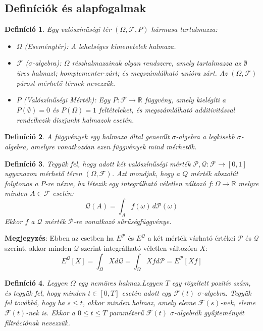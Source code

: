 \documentclass[12pt, a4paper]{article}
\newtheorem{definition}{Definíció}[subsection]
\begin{document}
\subsection{Definíciók és alapfogalmak}

\begin{definition}\label{def_elso}
Egy valószínűségi tér $(\Omega, \mathcal{F}, P)$ hármasa tartalmazza:
\begin{itemize}
    \item $\Omega$ (Eseménytér): A lehetséges kimenetelek halmaza.
    \item $\mathcal{F}$ ($\sigma$-algebra): $\Omega$ részhalmazainak olyan rendszere, amely tartalmazza az $\emptyset$ üres halmazt; komplementer-zárt; és megszámlálható unióra zárt. Az $(\Omega, \mathcal{F})$ párost mérhető térnek nevezzük.
    \item $P$ (Valószínűségi Mérték): Egy $P: \mathcal{F} \to \mathbb{R}$ függvény, amely kielégíti a $P(\emptyset)=0$ és $P(\Omega)=1$ feltételeket, és megszámlálható additivitással rendelkezik diszjunkt halmazok esetén.
\end{itemize}
\end{definition}

\begin{definition}\label{def_masodik}
A függvények egy halmaza által generált $\sigma$-algebra a legkisebb $\sigma$-algebra, amelyre vonatkozóan ezen függvények mind mérhetők.
\end{definition}

\begin{definition}\label{def_harmadik}
Tegyük fel, hogy adott két valószínűségi mérték $\mathcal{P},\mathcal{Q}: \mathcal{F} \to [0,1]$ ugyanazon mérhető téren $(\Omega, \mathcal{F})$. Azt mondjuk, hogy a $Q$ mérték abszolút folytonos a $P$-re nézve, ha létezik egy integrálható véletlen változó $f: \Omega \to \mathbb{R}$ melyre minden $A \in \mathcal{F}$ esetén:
\[
\mathcal{Q}(A) = \int_A f (\omega) \, d\mathcal{P}(\omega)
\]
Ekkor $f$ a $\mathcal{Q}$ mérték $\mathcal{P}$-re vonatkozó sűrűségfüggvénye.
\end{definition}

\noindent \textbf{Megjegyzés}: Ebben az esetben ha $E^{\mathcal{P}}$ és $E^{\mathcal{Q}}$ a két mérték várható értékei $\mathcal{P}$ és $\mathcal{Q}$ szerint, akkor minden $\mathcal{Q}$-szerint integrálható véletlen változóra $X$:
\[
E^{\mathcal{Q}}[X] = \int_{\Omega} X d\mathcal{Q} = \int_{\Omega} X f d\mathcal{P} = E^{\mathcal{P}}[X f]
\]

\begin{definition}\label{def_negyedik}
\cite{shreve2004} Legyen $\Omega$ egy nemüres halmaz.Legyen $T$ egy rögzített pozitív szám, és tegyük fel, hogy minden $t \in [0,T]$ esetén adott egy $\mathcal{F}(t)$ $\sigma$-algebra. Tegyük fel továbbá, hogy ha $s \le t$, akkor minden halmaz, amely eleme $\mathcal{F}(s)$-nek, eleme $\mathcal{F}(t)$-nek is. Ekkor a $0 \le t \le T$ paraméterű $\mathcal{F}(t)$ $\sigma$-algebrák gyűjteményét filtrációnak nevezzük.
\end{definition}
\end{document}
